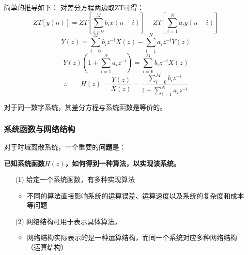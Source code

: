 \documentclass[notheorems,compress,mathserif,table]{beamer}
\begin{document}
\begin{frame}[shrink]\frametitle{}
\par 简单的推导如下：
对差分方程两边取ZT可得：
$$
ZT\left[y(n)\right]=ZT\left[\sum_{i=0}^{M}b_ix(n-i)\right] - ZT\left[ \sum_{i=1}^{N}a_iy(n-i)\right]
$$
$$Y(z)=\sum_{i=0}^{M}b_iz^{-i}X(z) - \sum_{i=1}^{N}a_iz^{-i}Y(z)$$
$$Y(z)\left (1 + \sum_{i=1}^{N}a_iz^{-i}\right ) =\sum_{i=0}^{M}b_iz^{-i}X(z)$$
$$\therefore\quad\quad
H(z)=\frac{Y(z)}{X(z)}= \frac{\sum_{i=0}^{M}b_iz^{-i}}{1+\sum_{i=1}^{N}a_iz^{-i}}$$

\par 对于同一数字系统，其差分方程与系统函数是等价的。
\end{frame}
\begin{frame}[shrink]\frametitle{系统函数与网络结构}
对于时域离散系统，一个重要的\textbf{问题}是：

\textbf{已知系统函数$H(z)$，如何得到一种算法，以实现该系统。}
\begin{enumerate}
  \item [(1)]给定一个系统函数，有多种实现算法
      \begin{itemize}
        \item 不同的算法直接影响系统的运算误差、运算速度以及系统的复杂度和成本等问题
      \end{itemize}

  \item [(2)]网络结构可用于表示具体算法，
      \begin{itemize}
        \item 网络结构实际表示的是一种运算结构，而同一个系统对应多种网络结构（运算结构）
      \end{itemize}

\end{enumerate}

\end{frame}
\end{document}
